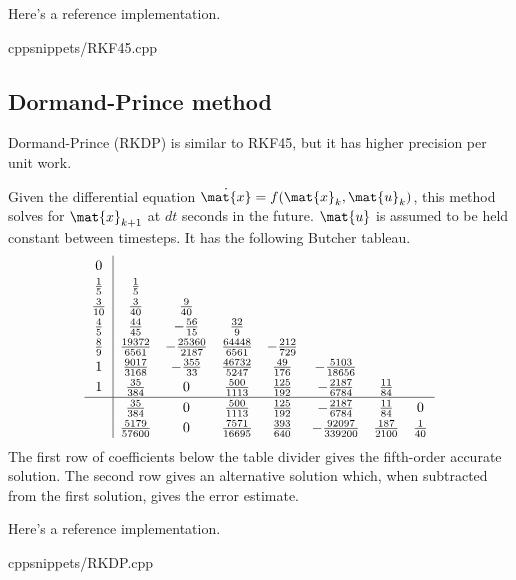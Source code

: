Here's a reference implementation.
\begin{coderemote}{cpp}{snippets/RKF45.cpp}
  \caption{RKF45 implementation in C++}
\end{coderemote}

\subsection{Dormand-Prince method}

Dormand-Prince (RKDP) is similar to RKF45, but it has higher precision per unit
work.
\begin{theorem}
  Given the differential equation $\dot{\mat{x}} = f(\mat{x}_k, \mat{u}_k)$,
  this method solves for $\mat{x}_{k+1}$ at $dt$ seconds in the future.
  $\mat{u}$ is assumed to be held constant between timesteps. It has the
  following Butcher tableau.
  \begin{equation*}
    \renewcommand\arraystretch{1.2}
    \begin{array}{c|ccccccc}
      0 \\
      \frac{1}{5} & \frac{1}{5} \\
      \frac{3}{10} & \frac{3}{40} & \frac{9}{40} \\
      \frac{4}{5} & \frac{44}{45} & -\frac{56}{15} & \frac{32}{9} \\
      \frac{8}{9} & \frac{19372}{6561} & -\frac{25360}{2187} &
        \frac{64448}{6561} & -\frac{212}{729} \\
      1 & \frac{9017}{3168} & -\frac{355}{33} & \frac{46732}{5247} &
        \frac{49}{176} & -\frac{5103}{18656} \\
      1 & \frac{35}{384} & 0 & \frac{500}{1113} & \frac{125}{192} &
        -\frac{2187}{6784} & \frac{11}{84} \\
      \hline
      & \frac{35}{384} & 0 & \frac{500}{1113} & \frac{125}{192} &
        -\frac{2187}{6784} & \frac{11}{84} & 0 \\
      & \frac{5179}{57600} & 0 & \frac{7571}{16695} & \frac{393}{640} &
        -\frac{92097}{339200} & \frac{187}{2100} & \frac{1}{40}
    \end{array}
  \end{equation*}
  The first row of coefficients below the table divider gives the fifth-order
  accurate solution. The second row gives an alternative solution which,
  when subtracted from the first solution, gives the error estimate.
\end{theorem}

Here's a reference implementation.
\begin{coderemote}{cpp}{snippets/RKDP.cpp}
  \caption{RKDP implementation in C++}
\end{coderemote}
